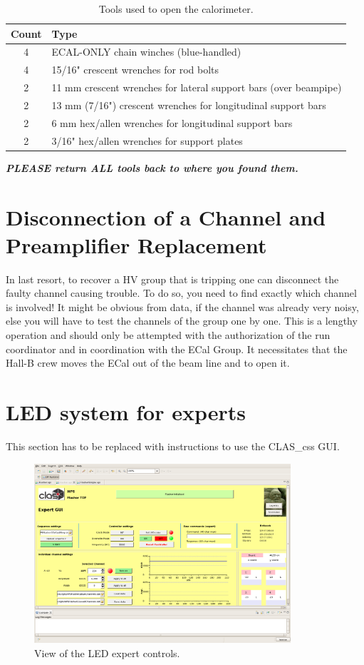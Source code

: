 \documentclass[12pt]{article}
\begin{document}
\begin{table}[htbp]\centering
    \begin{tabular}{c|l}\hline
        Count & Type \\\hline
4&   ECAL-ONLY chain winches (blue-handled)\\
4&   15/16" crescent wrenches for rod bolts\\
2&   11 mm crescent wrenches for lateral support bars (over beampipe)\\
2&   13 mm (7/16") crescent wrenches for longitudinal support bars\\ 
2&   6 mm hex/allen wrenches for longitudinal support bars\\
2&   3/16" hex/allen wrenches for support plates\\\hline
    \end{tabular}
    \caption{Tools used to open the calorimeter. \label{tab:tools}}
\end{table}

{\bf\em PLEASE return ALL tools back to where you found them.}

   \section{Disconnection of a Channel and Preamplifier Replacement}
     
      In last resort, to recover a HV group that is tripping one can disconnect the faulty channel causing trouble. To do so, you need to find exactly which channel is involved! It might be obvious from data, if the channel was already very noisy, else you will have to test the channels of the group one by one. This is a lengthy operation and should only be attempted with the authorization of the run coordinator and in coordination with the ECal Group. It necessitates that the Hall-B crew moves the ECal out of the beam line and to open it.

   \section{LED system for experts}

This section has to be replaced with instructions to use the CLAS\_css GUI.

\begin{figure}[htbp]
\center
\includegraphics[width=0.85\textwidth]{pics/LEDExpert_2014_12_20.png}
\caption{\label{LEDexpert} View of the LED expert controls.}
\end{figure}
\end{document}
